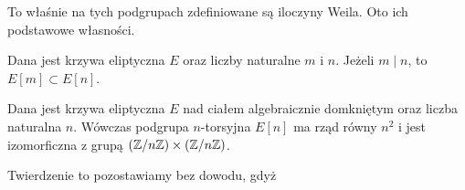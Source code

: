 To właśnie na tych podgrupach zdefiniowane są iloczyny Weila.
Oto ich podstawowe własności.

\begin{fact}
Dana jest krzywa eliptyczna $E$
oraz liczby naturalne $m$ i $n$.
Jeżeli $m \mid n$, to $E[m] \subset E[n]$.
\end{fact}

\begin{theorem}
Dana jest krzywa eliptyczna $E$ nad ciałem algebraicznie domkniętym
oraz liczba naturalna $n$.
Wówczas podgrupa $n$-torsyjna $E[n]$ ma rząd równy $n^2$
i jest izomorficzna z grupą $(\mathbb{Z} / n\mathbb{Z})\times(\mathbb{Z} / n\mathbb{Z})$.
\end{theorem}

Twierdzenie to pozostawiamy bez dowodu,
gdyż